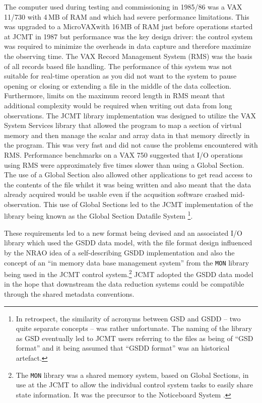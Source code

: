 \documentclass[final,authoryear,5p,times,twocolumn]{elsarticle}
\begin{document}
The computer used during testing and commissioning in 1985/86 was a
VAX 11/730 with 4\,MB of RAM and which had severe performance
limitations. This was upgraded to a MicroVAXwith 16\,MB of RAM just
before operations started at JCMT in 1987 but performance was the key
design driver: the control system was required to minimize the
overheads in data capture and therefore maximize the observing
time. The VAX Record Management System (RMS) was the basis of all
records based file handling. The performance of this system was not
suitable for real-time operation as you did not want to the system to
pause opening or closing or extending a file in the middle of the data
collection. Furthermore, limits on the maximum record length in RMS
meant that additional complexity would be required when writing out
data from long observations. The JCMT library implementation was
designed to utilize the VAX System Services library that allowed the
program to map a section of virtual memory and then manage the scalar
and array data in that memory directly in the program. This was very
fast and did not cause the problems encountered with RMS. Performance
benchmarks on a VAX 750 \citep{mtin33} suggested that I/O operations
using RMS were approximately five times slower than using a Global
Section. The use of a Global Section also allowed other applications
to get read access to the contents of the file whilst it was being
written and also meant that the data already acquired would be usable
even if the acqusition software crashed mid-observation. This use of
Global Sections led to the JCMT implementation of the library being
known as the Global Section Datafile System
\citep[GSD;][]{mtin33}\footnote{In retrospect, the similarity of
  acronyms between GSD and GSDD -- two quite separate concepts -- was
  rather unfortunate. The naming of the library as GSD eventually led
  to JCMT users referring to the files as being of ``GSD format'' and
  it being assumed that ``GSDD format'' was an historical artefact.}.

These requirements led to a new format being devised and an associated
I/O library which used the GSDD data model, with the file format design
influenced by the NRAO idea of a self-describing GSDD
implementation and also the concept of an ``in memory data base
management system'' from the \texttt{MON} library being used in the
JCMT control system.\footnote{The \texttt{MON} library was a shared
  memory system, based on Global Sections, in use at the JCMT to allow
  the individual control system tasks to easily share state
  information. It was the precursor to the Noticeboard System
  \citep[NBS;][]{SUN77}.}  JCMT adopted the GSDD data model in the hope
that downstream the data reduction systems could be compatible through
the shared metadata conventions.
\end{document}
